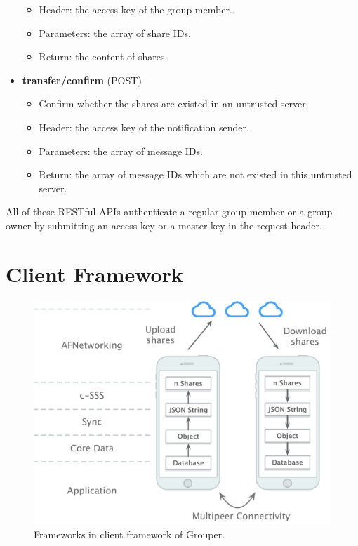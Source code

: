 \documentclass[a4paper,11pt]{report}
\begin{document}
\begin{itemize}[leftmargin=7mm]
\begin{itemize}
		\item Header: the access key of the group member..
		\item Parameters: the array of share IDs.
		\item Return: the content of shares.
	\end{itemize}
	\item 
	\textbf{transfer/confirm} (POST)
	\begin{itemize}
		\item Confirm whether the shares are existed in an untrusted server. 
		\item Header: the access key of the notification sender.
		\item Parameters: the array of message IDs.
		\item Return: the array of message IDs which are not existed in this untrusted server.
	\end{itemize}
\end{itemize}

All of these RESTful APIs authenticate a regular group member or a group owner by submitting an access key or a master key in the request header.

\section{Client Framework} \label{section:client_framework}

\begin{figure}
	\centering
	\includegraphics[scale=0.6]{frameworks}
	\caption{Frameworks in client framework of Grouper.}
	\label{fig:frameworks}
\end{figure}
\end{document}
